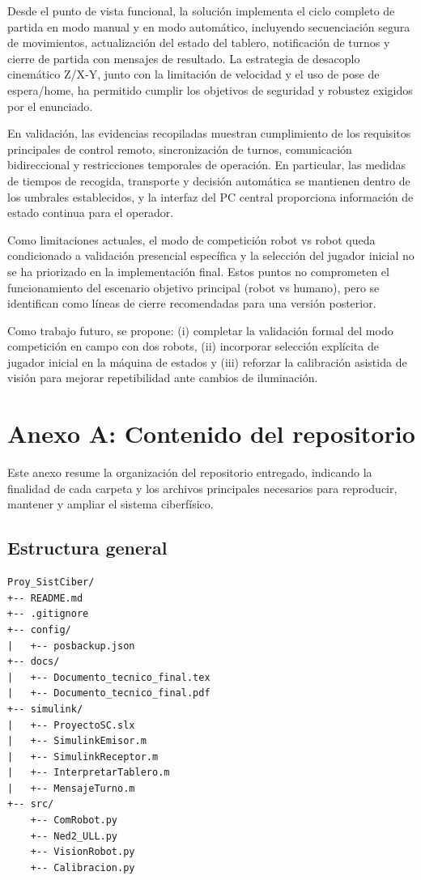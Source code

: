 \documentclass[12pt,a4paper]{article}
\begin{document}
Desde el punto de vista funcional, la solución implementa el ciclo completo de partida en modo manual y en modo automático, incluyendo secuenciación segura de movimientos, actualización del estado del tablero, notificación de turnos y cierre de partida con mensajes de resultado. La estrategia de desacoplo cinemático Z/X-Y, junto con la limitación de velocidad y el uso de pose de espera/home, ha permitido cumplir los objetivos de seguridad y robustez exigidos por el enunciado.

En validación, las evidencias recopiladas muestran cumplimiento de los requisitos principales de control remoto, sincronización de turnos, comunicación bidireccional y restricciones temporales de operación. En particular, las medidas de tiempos de recogida, transporte y decisión automática se mantienen dentro de los umbrales establecidos, y la interfaz del PC central proporciona información de estado continua para el operador.

Como limitaciones actuales, el modo de competición robot vs robot queda condicionado a validación presencial específica y la selección del jugador inicial no se ha priorizado en la implementación final. Estos puntos no comprometen el funcionamiento del escenario objetivo principal (robot vs humano), pero se identifican como líneas de cierre recomendadas para una versión posterior.

Como trabajo futuro, se propone: (i) completar la validación formal del modo competición en campo con dos robots, (ii) incorporar selección explícita de jugador inicial en la máquina de estados y (iii) reforzar la calibración asistida de visión para mejorar repetibilidad ante cambios de iluminación.

\newpage
\appendix
\section{Anexo A: Contenido del repositorio}

Este anexo resume la organización del repositorio entregado, indicando la finalidad de cada carpeta y los archivos principales necesarios para reproducir, mantener y ampliar el sistema ciberfísico.

\subsection{Estructura general}

\begin{verbatim}
Proy_SistCiber/
+-- README.md
+-- .gitignore
+-- config/
|   +-- posbackup.json
+-- docs/
|   +-- Documento_tecnico_final.tex
|   +-- Documento_tecnico_final.pdf
+-- simulink/
|   +-- ProyectoSC.slx
|   +-- SimulinkEmisor.m
|   +-- SimulinkReceptor.m
|   +-- InterpretarTablero.m
|   +-- MensajeTurno.m
+-- src/
    +-- ComRobot.py
    +-- Ned2_ULL.py
    +-- VisionRobot.py
    +-- Calibracion.py
\end{verbatim}
\end{document}
